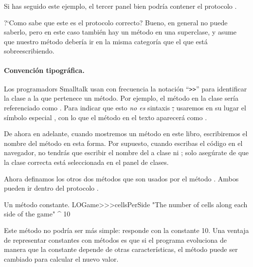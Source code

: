 \documentclass[a4paper,10pt,twoside]{book}
\begin{document}
Si has seguido este ejemplo, el tercer panel bien podr\'ia contener el protocolo .

?`Como sabe \pharo que este es el protocolo correcto? Bueno, en general  \pharo{} no puede saberlo, pero en este caso tambi\'en hay un m\'etodo  en una superclase, y \pharo asume que nuestro m\'etodo  deber\'ia ir en la misma categor\'ia que el que est\'a sobreescribiendo. 

\paragraph{Convenci\'on tipogr\'afica.} Los programadors Smalltalk usan con frecuencia la notaci\'on ``\verb|>>|'' para identificar la clase a la que pertenece un m\'etodo. Por ejemplo, el m\'etodo  en la clase  ser\'ia referenciado como .
Para indicar que esto \emph{no es} sintaxis \st, usaremos en su lugar el s\'imbolo especial \ct{>>>}, con lo que el m\'etodo en el texto aparecer\'a como .

De ahora en adelante, cuando mostremos un m\'etodo en este libro, escribiremos el nombre del m\'etodo en esta forma. Por supuesto, cuando escribas el c\'odigo en el navegador, no tendr\'as que escribir el nombre del a clase ni \ct{>>>}; solo aseg\'urate de que la clase correcta est\'a seleccionada en el panel de clases. 

Ahora definamos los otros dos m\'etodos que son usados por el m\'etodo . Ambos pueden ir dentro del protocolo .

\begin{method}[sbegamecellsperside]{Un m\'etodo constante.}
LOGame>>>cellsPerSide
   "The number of cells along each side of the game"
   ^ 10
\end{method}

Este m\'etodo no podr\'ia ser m\'as simple: responde con la constante 10. Una ventaja de representar constantes con m\'etodos es que si el programa evoluciona de manera que la constante depende de otras caracter\'isticas, el m\'etodo puede ser cambiado para calcular el nuevo valor. 
\end{document}
